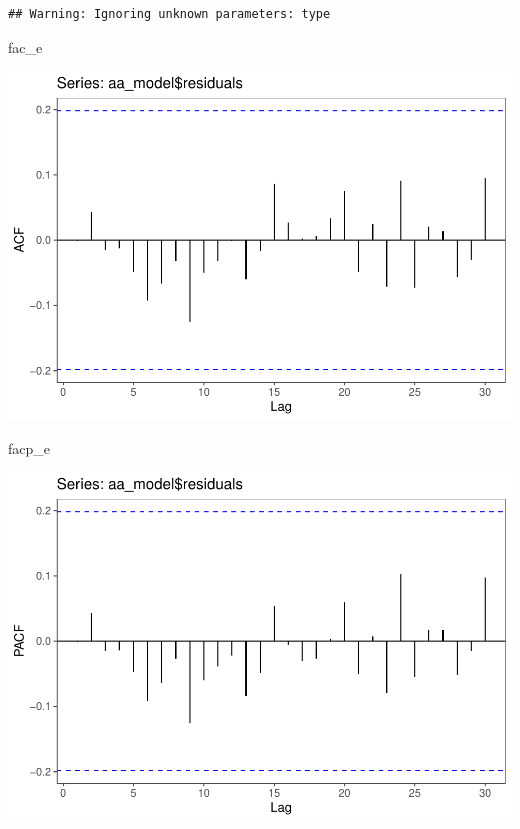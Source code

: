 \documentclass[
]{article}
\newenvironment{Shaded}{\begin{snugshade}}{\end{snugshade}}
\newcommand{\NormalTok}[1]{#1}
\begin{document}
\begin{verbatim}
## Warning: Ignoring unknown parameters: type
\end{verbatim}

\begin{Shaded}
\begin{Highlighting}[]
\NormalTok{fac_e}
\end{Highlighting}
\end{Shaded}

\begin{center}\includegraphics{Econo2_P5_files/figure-latex/estimation autoarima-1} \end{center}

\begin{Shaded}
\begin{Highlighting}[]
\NormalTok{facp_e}
\end{Highlighting}
\end{Shaded}

\begin{center}\includegraphics{Econo2_P5_files/figure-latex/estimation autoarima-2} \end{center}
\end{document}
